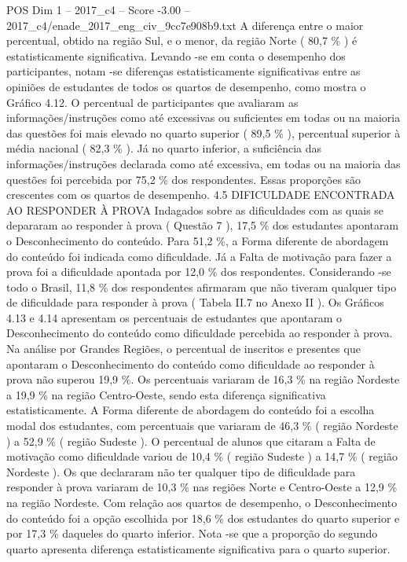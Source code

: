\begin{textsample}{POS Dim 1 – 2017\_c4 – Score -3.00 – 2017\_c4/enade\_2017\_eng\_civ\_9cc7e908b9.txt}
A diferença entre o maior percentual, obtido na região Sul, e o menor, da região Norte ( 80,7 \% ) é estatisticamente significativa.
Levando -se em conta o desempenho dos participantes, notam -se diferenças estatisticamente significativas entre as opiniões de estudantes de todos os quartos de desempenho, como mostra o Gráfico 4.12.
O percentual de participantes que avaliaram as informações/instruções como até excessivas ou suficientes em todas ou na maioria das questões foi mais elevado no quarto superior ( 89,5 \% ), percentual superior à média nacional ( 82,3 \% ).
Já no quarto inferior, a suficiência das informações/instruções declarada como até excessiva, em todas ou na maioria das questões foi percebida por 75,2 \% dos respondentes.
Essas proporções são crescentes com os quartos de desempenho. 4.5 DIFICULDADE ENCONTRADA AO RESPONDER À PROVA Indagados sobre as dificuldades com as quais se depararam ao responder à prova ( Questão 7 ), 17,5 \% dos estudantes apontaram o Desconhecimento do conteúdo.
Para 51,2 \%, a Forma diferente de abordagem do conteúdo foi indicada como dificuldade.
Já a Falta de motivação para fazer a prova foi a dificuldade apontada por 12,0 \% dos respondentes.
Considerando -se todo o Brasil, 11,8 \% dos respondentes afirmaram que não tiveram qualquer tipo de dificuldade para responder à prova ( Tabela II.7 no Anexo II ).
Os Gráficos 4.13 e 4.14 apresentam os percentuais de estudantes que apontaram o Desconhecimento do conteúdo como dificuldade percebida ao responder à prova.
Na análise por Grandes Regiões, o percentual de inscritos e presentes que apontaram o Desconhecimento do conteúdo como dificuldade ao responder à prova não superou 19,9 \%.
Os percentuais variaram de 16,3 \% na região Nordeste a 19,9 \% na região Centro-Oeste, sendo esta diferença significativa estatisticamente.
A Forma diferente de abordagem do conteúdo foi a escolha modal dos estudantes, com percentuais que variaram de 46,3 \% ( região Nordeste ) a 52,9 \% ( região Sudeste ).
O percentual de alunos que citaram a Falta de motivação como dificuldade variou de 10,4 \% ( região Sudeste ) a 14,7 \% ( região Nordeste ).
Os que declararam não ter qualquer tipo de dificuldade para responder à prova variaram de 10,3 \% nas regiões Norte e Centro-Oeste a 12,9 \% na região Nordeste.
Com relação aos quartos de desempenho, o Desconhecimento do conteúdo foi a opção escolhida por 18,6 \% dos estudantes do quarto superior e por 17,3 \% daqueles do quarto inferior.
Nota -se que a proporção do segundo quarto apresenta diferença estatisticamente significativa para o quarto superior.

\end{textsample}

